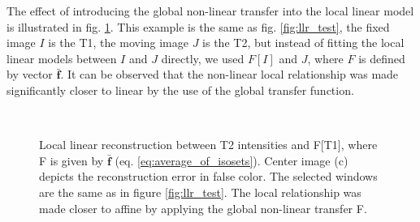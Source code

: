 The effect of introducing the global non-linear transfer into the local linear model is illustrated in fig. \ref{fig:ecc_test_good}. This example is the same as fig. \ref{fig:llr_test}, the fixed image $I$ is the T1, the moving image $J$ is the T2, but instead of fitting the local linear models between $I$ and $J$ directly, we used $F[I]$ and $J$, where $F$ is defined by vector $\mathbf{\bar{f}}$. It can be observed that the non-linear local relationship was made significantly closer to linear by the use of the global transfer function.
\begin{figure}[t]
\centering
    \\
    \caption{{\small Local linear reconstruction between T2 intensities and F[T1], where F is given by $\mathbf{\bar{f}}$ (eq. \eqref{eq:average_of_isosets}). Center image (c) depicts the reconstruction error in false color. The selected windows are the same as in figure \ref{fig:llr_test}. The local relationship was made closer to affine by applying the global non-linear transfer F.}}
\label{fig:ecc_test_good}
\end{figure}


